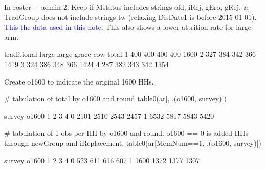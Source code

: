 In \textsf{roster + admin} 2: Keep if \textsf{Mstatus} includes strings old, iRej, gEro, gRej, \& \textsf{TradGroup} does not include strings tw (relaxing  \textsf{DisDate1} is before 2015-01-01). \textcolor{blue}{This the data used in this note.} This also shows a lower attrition rate for \textsf{large} arm. \gobblepars
\begin{Schunk}
\begin{Soutput}
  traditional large large grace cow total
1         400   400         400 400  1600
2         327   384         342 366  1419
3         324   386         348 366  1424
4         287   382         343 342  1354
\end{Soutput}
\end{Schunk}
Create \textsf{o1600} to indicate the original 1600 HHs.
\begin{Schunk}
\begin{Sinput}
# tabulation of total by o1600 and round
table0(ar[, .(o1600, survey)])
\end{Sinput}
\begin{Soutput}
     survey
o1600    1    2    3    4
    0 2101 2510 2543 2457
    1 6532 5817 5843 5420
\end{Soutput}
\begin{Sinput}
# tabulation of 1 obs per HH by o1600 and round. o1600 == 0 is added HHs through newGroup and iReplacement.
table0(ar[MemNum==1, .(o1600, survey)])
\end{Sinput}
\begin{Soutput}
     survey
o1600    1    2    3    4
    0  523  611  616  607
    1 1600 1372 1377 1307
\end{Soutput}
\end{Schunk}

